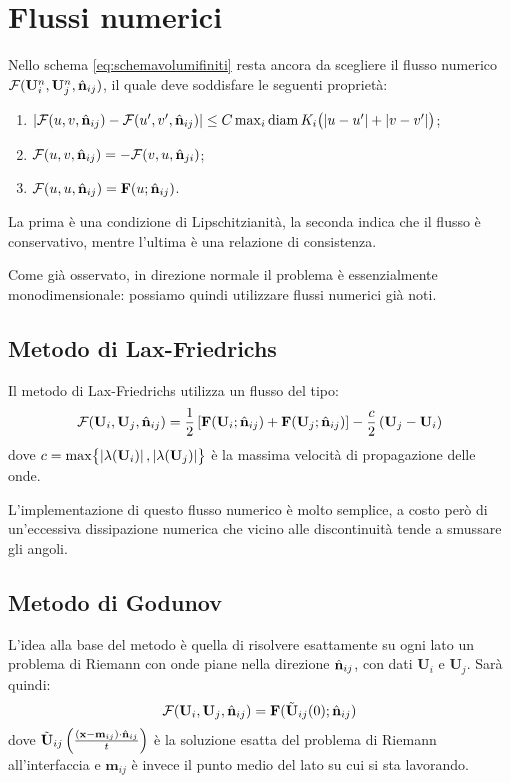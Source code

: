 \section{Flussi numerici} \label{app:flussinum}
Nello schema \eqref{eq:schemavolumifiniti} resta ancora da scegliere il flusso numerico $\mathbf{\mathcal{F}}(\mathbf U^n_i, \mathbf U^n_j, \hat{\mathbf{n}}_{ij})$, il quale deve soddisfare le seguenti proprietà:
\begin{enumerate}
\item $\left| \mathbf{\mathcal{F}}(u, v, \hat{\mathbf{n}}_{ij}) - \mathbf{\mathcal{F}}(u', v', \hat{\mathbf{n}}_{ij})  \right| \le C \max_i \operatorname{diam} K_i \bigl( \left| u-u' \right| + \left| v-v' \right| \bigr)$;
\item $\mathbf{\mathcal{F}}(u, v, \hat{\mathbf{n}}_{ij}) = - \mathbf{\mathcal{F}}(v, u, \hat{\mathbf{n}}_{ji})$;
\item $\mathbf{\mathcal{F}}(u, u, \hat{\mathbf{n}}_{ij}) = \mathbf{F}(u; \hat{\mathbf{n}}_{ij})$.
\end{enumerate}
La prima è una condizione di Lipschitzianità, la seconda indica che il flusso è conservativo, mentre l'ultima è una relazione di consistenza.

Come già osservato, in direzione normale il problema è essenzialmente monodimensionale: possiamo quindi utilizzare flussi numerici già noti.
\subsection{Metodo di Lax-Friedrichs}
Il metodo di Lax-Friedrichs utilizza un flusso del tipo:
\begin{equation*}
\mathbf{\mathcal{F}}(\mathbf U_i, \mathbf U_j, \hat{\mathbf{n}}_{ij}) = \frac{1}{2} \left[ \mathbf{F}(\mathbf U_i; \hat{\mathbf{n}}_{ij}) + \mathbf{F} (\mathbf U_j; \hat{\mathbf{n}}_{ij}) \right] - \frac{c}{2} \left( \mathbf U_j - \mathbf U_i \right)
\end{equation*}
dove $c = \max \bigl\{ \left| \lambda(\mathbf U_i) \right|, \left| \lambda(\mathbf U_j) \right| \bigr\}$ è la massima velocità di propagazione delle onde.

L'implementazione di questo flusso numerico è molto semplice, a costo però di un'eccessiva dissipazione numerica che vicino alle discontinuità tende a smussare gli angoli.
\subsection{Metodo di Godunov}
L'idea alla base del metodo è quella di risolvere esattamente su ogni lato un problema di Riemann con onde piane nella direzione $\hat{\mathbf{n}}_{ij}$, con dati $\mathbf{U}_i$ e $\mathbf{U}_j$. Sarà quindi:
\begin{equation*}
\mathbf{\mathcal{F}}(\mathbf{U}_i, \mathbf{U}_j, \hat{\mathbf{n}}_{ij} ) = \mathbf{F}( \tilde{\mathbf{U}}_{ij}(0); \hat{\mathbf{n}}_{ij} )
\end{equation*}
dove $\tilde{\mathbf{U}}_{ij}\left( \frac{\left(\mathbf{x}-\mathbf{m}_{ij}\right) \cdot \hat{\mathbf{n}}_{ij}}{t}\right)$ è la soluzione esatta del problema di Riemann all'interfaccia e $\mathbf{m}_{ij}$ è invece il punto medio del lato su cui si sta lavorando.
